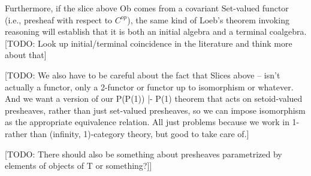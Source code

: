 Furthermore, if the slice above Ob comes from a covariant Set-valued functor (i.e., presheaf with respect to $C^{op}$), the same kind of Loeb’s theorem invoking reasoning will establish that it is both an initial algebra and a terminal coalgebra. [TODO: Look up initial/terminal coincidence in the literature and think more about that]

[TODO: We also have to be careful about the fact that Slices above – isn’t actually a functor, only a 2-functor or functor up to isomorphism or whatever. And we want a version of our P(P(1)) |- P(1) theorem that acts on setoid-valued presheaves, rather than just set-valued presheaves, so we can impose isomorphism as the appropriate equivalence relation. All just problems because we work in 1- rather than (infinity, 1)-category theory, but good to take care of.]

[TODO: There should also be something about presheaves parametrized by elements of objects of T or something?]]